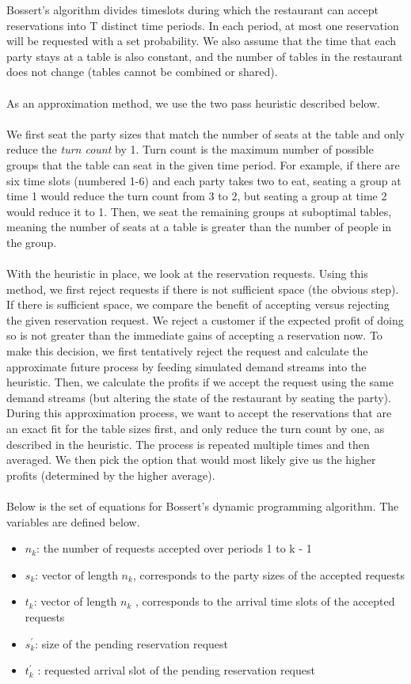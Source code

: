 \documentclass[12pt, titlepage]{article}
\begin{document}
Bossert's algorithm divides timeslots during which the restaurant can accept reservations into T distinct time periods. In each period, at most one reservation will be requested with a set probability. We also assume that the time that each party stays at a table is also constant, and the number of tables in the restaurant does not change (tables cannot be combined or shared).\\
\\
As an approximation method, we use the two pass heuristic described below.\\
\\
We first seat the party sizes that match the number of seats at the table and only reduce the \textit{turn count} by 1. Turn count is the maximum number of possible groups that the table can seat in the given time period. For example, if there are six time slots (numbered 1-6) and each party takes two to eat, seating a group at time 1 would reduce the turn count from 3 to 2, but seating a group at time 2 would reduce it to 1. Then, we seat the remaining groups at suboptimal tables, meaning the number of seats at a table is greater than the number of people in the group.\\
\\
With the heuristic in place, we look at the reservation requests. Using this method, we first reject requests if there is not sufficient space (the obvious step). If there is sufficient space, we compare the benefit of accepting versus rejecting the given reservation request. We reject a customer if the expected profit of doing so is not greater than the immediate gains of accepting a reservation now. To make this decision, we first tentatively reject the request and calculate the approximate future process by feeding simulated demand streams into the heuristic. Then, we calculate the profits if we accept the request using the same demand streams (but altering the state of the restaurant by seating the party). During this approximation process, we want to accept the reservations that are an exact fit for the table sizes first, and only reduce the turn count by one, as described in the heuristic. The process is repeated multiple times and then averaged. We then pick the option that would most likely give us the higher profits (determined by the higher average).\\
\\
Below is the set of equations for Bossert's dynamic programming algorithm. The variables are defined below.

\begin{itemize}
\item $n_{k}$: the number of requests accepted over periods 1 to k - 1
\item $s_{k}$:  vector of length $n_{k}$, corresponds to the party sizes of the accepted requests
\item $t_{k}$: vector of length $n_{k}$ , corresponds to the arrival time slots of the accepted requests
\item $s^{'}_{k}$: size of the pending reservation request
\item $t^{'}_{k}$  : requested arrival slot of the pending reservation request
\end{itemize}
\end{document}
